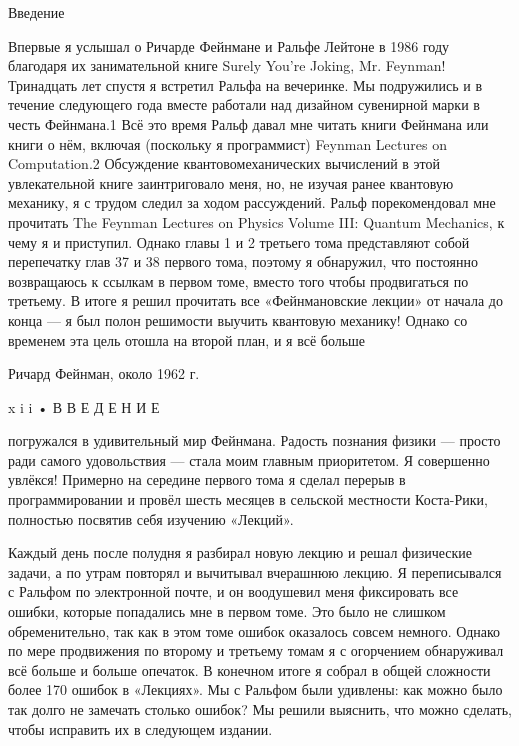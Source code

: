 \documentclass[11pt,oneside]{article}
\begin{document}
Введение\par



Впервые я услышал о Ричарде Фейнмане и Ральфе Лейтоне в 1986 году благодаря их занимательной книге Surely You’re Joking, Mr. Feynman! Тринадцать лет спустя я встретил Ральфа на вечеринке. Мы подружились и в течение следующего года вместе работали над дизайном сувенирной марки в честь Фейнмана.1 Всё это время Ральф давал мне читать книги Фейнмана или книги о нём, включая (поскольку я программист) Feynman Lectures on Computation.2 Обсуждение квантовомеханических вычислений в этой увлекательной книге заинтриговало меня, но, не изучая ранее квантовую механику, я с трудом следил за ходом рассуждений. Ральф порекомендовал мне прочитать The Feynman Lectures on Physics Volume III: Quantum Mechanics, к чему я и приступил. Однако главы 1 и 2 третьего тома представляют собой перепечатку глав 37 и 38 первого тома, поэтому я обнаружил, что постоянно возвращаюсь к ссылкам в первом томе, вместо того чтобы продвигаться по третьему. В итоге я решил прочитать все «Фейнмановские лекции» от начала до конца --- я был полон решимости выучить квантовую механику! Однако со временем эта цель отошла на второй план, и я всё больше\par



Ричард Фейнман, около 1962 г.\par



x i i • В В Е Д Е Н И Е\par



погружался в удивительный мир Фейнмана. Радость познания физики --- просто ради самого удовольствия --- стала моим главным приоритетом. Я совершенно увлёкся! Примерно на середине первого тома я сделал перерыв в программировании и провёл шесть месяцев в сельской местности Коста-Рики, полностью посвятив себя изучению «Лекций».\par



Каждый день после полудня я разбирал новую лекцию и решал физические задачи, а по утрам повторял и вычитывал вчерашнюю лекцию. Я переписывался с Ральфом по электронной почте, и он воодушевил меня фиксировать все ошибки, которые попадались мне в первом томе. Это было не слишком обременительно, так как в этом томе ошибок оказалось совсем немного. Однако по мере продвижения по второму и третьему томам я с огорчением обнаруживал всё больше и больше опечаток. В конечном итоге я собрал в общей сложности более 170 ошибок в «Лекциях». Мы с Ральфом были удивлены: как можно было так долго не замечать столько ошибок? Мы решили выяснить, что можно сделать, чтобы исправить их в следующем издании.\par
\end{document}
